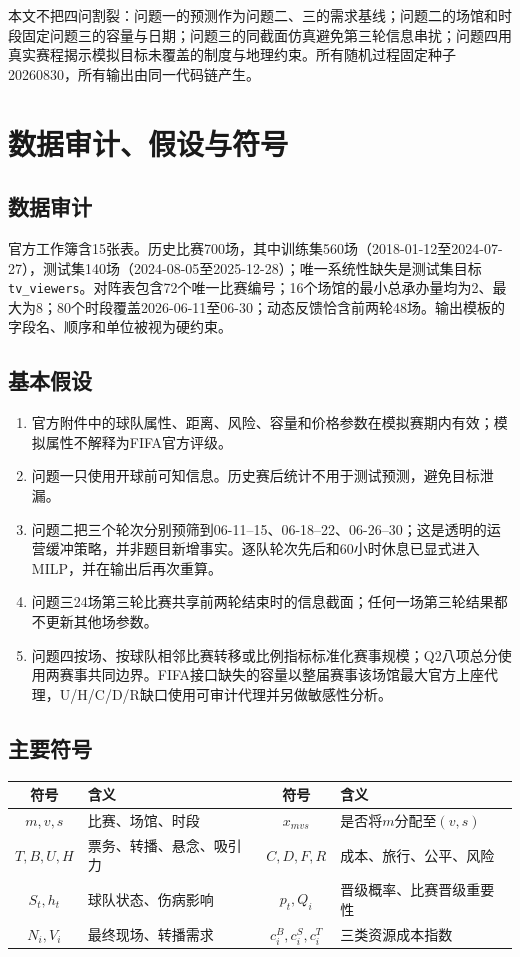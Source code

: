 \documentclass[UTF8,11pt,a4paper]{ctexart}
\begin{document}
本文不把四问割裂：问题一的预测作为问题二、三的需求基线；问题二的场馆和时段固定问题三的容量与日期；问题三的同截面仿真避免第三轮信息串扰；问题四用真实赛程揭示模拟目标未覆盖的制度与地理约束。所有随机过程固定种子20260830，所有输出由同一代码链产生。

\section{数据审计、假设与符号}
\subsection{数据审计}
官方工作簿含15张表。历史比赛700场，其中训练集560场（2018-01-12至2024-07-27），测试集140场（2024-08-05至2025-12-28）；唯一系统性缺失是测试集目标 \texttt{tv\_viewers}。对阵表包含72个唯一比赛编号；16个场馆的最小总承办量均为2、最大为8；80个时段覆盖2026-06-11至06-30；动态反馈恰含前两轮48场。输出模板的字段名、顺序和单位被视为硬约束。

\subsection{基本假设}
\begin{enumerate}[label=H\arabic*.]
\item 官方附件中的球队属性、距离、风险、容量和价格参数在模拟赛期内有效；模拟属性不解释为FIFA官方评级。
\item 问题一只使用开球前可知信息。历史赛后统计不用于测试预测，避免目标泄漏。
\item 问题二把三个轮次分别预筛到06-11--15、06-18--22、06-26--30；这是透明的运营缓冲策略，并非题目新增事实。逐队轮次先后和60小时休息已显式进入MILP，并在输出后再次重算。
\item 问题三24场第三轮比赛共享前两轮结束时的信息截面；任何一场第三轮结果都不更新其他场参数。
\item 问题四按场、按球队相邻比赛转移或比例指标标准化赛事规模；Q2八项总分使用两赛事共同边界。FIFA接口缺失的容量以整届赛事该场馆最大官方上座代理，U/H/C/D/R缺口使用可审计代理并另做敏感性分析。
\end{enumerate}

\subsection{主要符号}
\begin{table}[H]\centering\small
\begin{tabularx}{\textwidth}{cXcX}
\toprule
符号 & 含义 & 符号 & 含义\\\midrule
$m,v,s$ & 比赛、场馆、时段 & $x_{mvs}$ & 是否将$m$分配至$(v,s)$\\
$T,B,U,H$ & 票务、转播、悬念、吸引力 & $C,D,F,R$ & 成本、旅行、公平、风险\\
$S_t,h_t$ & 球队状态、伤病影响 & $p_t,Q_i$ & 晋级概率、比赛晋级重要性\\
$N_i,V_i$ & 最终现场、转播需求 & $c_i^B,c_i^S,c_i^T$ & 三类资源成本指数\\
\bottomrule
\end{tabularx}
\end{table}
\end{document}

